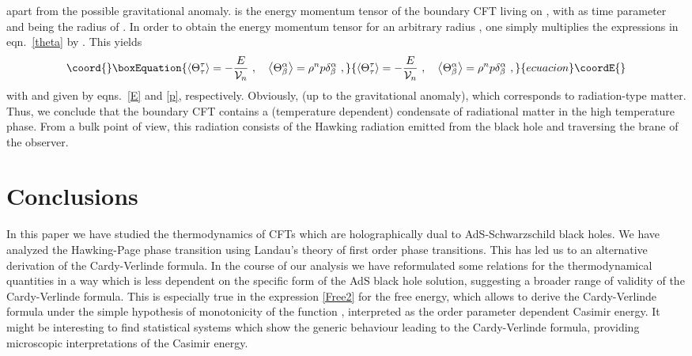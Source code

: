 \documentclass[a4paper,12pt]{article}
\begin{document}
apart from the possible gravitational anomaly. \coordHE{} is the
energy momentum tensor of the boundary CFT living on \coordHE{}, with \coordHE{} as time parameter and \coordHE{} being the radius of
\coordHE{}. In order to obtain the energy momentum tensor for an arbitrary
radius \myHighlight{$\rho$}\coordHE{}, one simply multiplies the expressions in eqn.\
\eqref{theta} by \coordHE{}. This yields
\begin{equation}\coord{}\boxEquation{
\label{theta2}
  \left\langle\Theta^\tau_\tau \right\rangle
  = - \frac{E}{\V_n}~,\quad
  \left\langle\Theta^\alpha_\beta\right\rangle
  = \rho^n p \delta^\alpha_\beta~,
}{
\left\langle\Theta^\tau_\tau \right\rangle
  = - \frac{E}{\V_n}~,\quad
  \left\langle\Theta^\alpha_\beta\right\rangle
  = \rho^n p \delta^\alpha_\beta~,
}{ecuacion}\coordE{}\end{equation}
with \coordHE{} and \coordHE{} given by eqns.\ \eqref{E} and \eqref{p}, respectively.
Obviously, \myHighlight{$\Theta^i_i=0$}\coordHE{} (up to the gravitational anomaly), which
corresponds to radiation-type matter. Thus, we conclude that the boundary
CFT contains a (temperature dependent) condensate of radiational matter in
the high temperature phase. From a bulk point of view, this radiation
consists of the Hawking radiation emitted from the black hole and
traversing the brane of the observer.

\section{Conclusions}
In this paper we have studied the thermodynamics of CFTs which are
holographically dual to AdS-Schwarzschild black holes. We have analyzed the
Hawking-Page phase transition using  Landau's theory of first order phase
transitions. This has led us to an alternative derivation of the
Cardy-Verlinde formula. In the course of our analysis we have reformulated
some relations for the thermodynamical quantities in a way which is
less dependent on the specific form of the AdS black hole solution,
suggesting a broader range of validity of the  Cardy-Verlinde
formula. This is especially true in the expression \eqref{Free2} for
the free energy, which allows to derive the Cardy-Verlinde formula
under the simple hypothesis of monotonicity of the function
\coordHE{}, interpreted as the order parameter dependent Casimir
energy. It might be interesting to find statistical systems which show
the generic behaviour leading to the Cardy-Verlinde formula, providing
microscopic interpretations of the Casimir energy.
\end{document}
